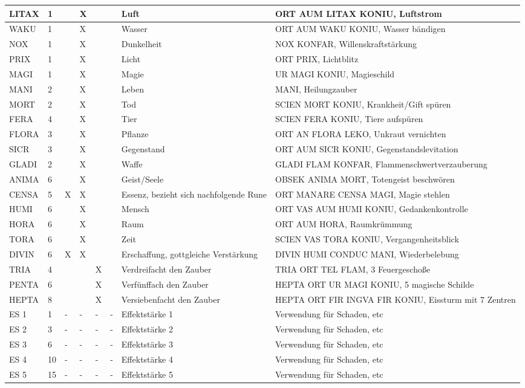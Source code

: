\documentclass{article}
\begin{document}
\begin{footnotesize}
\begin{tabular}{|m{1.7cm}|m{0.3cm}|m{1cm}|m{1cm}|m{1cm}|m{1cm}|m{3cm}|m{5cm}|}
\hline
LITAX&1&&X&&&Luft&ORT AUM LITAX KONIU, Luftstrom\\
\hline
WAKU&1&&X&&&Wasser&ORT AUM WAKU KONIU, Wasser bändigen\\
\hline
NOX&1&&X&&&Dunkelheit&NOX KONFAR, Willenskraftstärkung\\
\hline
PRIX&1&&X&&&Licht&ORT PRIX, Lichtblitz\\
\hline
MAGI&1&&X&&&Magie&UR MAGI KONIU, Magieschild\\
\hline
MANI&2&&X&&&Leben&MANI, Heilungzauber\\
\hline
MORT&2&&X&&&Tod&SCIEN MORT KONIU, Krankheit/Gift spüren\\
\hline
\hline
FERA&4&&X&&&Tier&SCIEN FERA KONIU, Tiere aufspüren\\
\hline
FLORA&3&&X&&&Pflanze&ORT AN FLORA LEKO, Unkraut vernichten\\
\hline
SICR&3&&X&&&Gegenstand&ORT AUM SICR KONIU, Gegenstandslevitation\\
\hline
GLADI&2&&X&&&Waffe&GLADI FLAM KONFAR, Flammenschwertverzauberung\\
\hline
\hline
ANIMA&6&&X&&&Geist/Seele&OBSEK ANIMA MORT, Totengeist beschwören\\
\hline
CENSA&5&X&X&&&Essenz, bezieht sich nachfolgende Rune&ORT MANARE CENSA MAGI, Magie stehlen\\
\hline
HUMI&6&&X&&&Mensch&ORT VAS AUM HUMI KONIU, Gedankenkontrolle\\
\hline
HORA&6&&X&&&Raum&ORT AUM HORA, Raumkrümmung\\
\hline
TORA&6&&X&&&Zeit&SCIEN VAS TORA KONIU, Vergangenheitsblick\\
\hline
DIVIN&6&X&X&&&Erschaffung, gottgleiche Verstärkung&DIVIN HUMI CONDUC MANI, Wiederbelebung\\
\hline
TRIA&4&&&X&&Verdreifacht den Zauber&TRIA ORT TEL FLAM, 3 Feuergeschoße\\
\hline
PENTA&6&&&X&&Verfünffach den Zauber&HEPTA ORT UR MAGI KONIU, 5 magische Schilde\\
\hline
HEPTA&8&&&X&&Versiebenfacht den Zauber&HEPTA ORT FIR INGVA FIR KONIU, Eissturm mit 7 Zentren\\
\hline
\hline
ES 1&1&-&-&-&-&Effektstärke 1&Verwendung für Schaden, etc\\
\hline
ES 2&3&-&-&-&-&Effektstärke 2&Verwendung für Schaden, etc\\
\hline
ES 3&6&-&-&-&-&Effektstärke 3&Verwendung für Schaden, etc\\
\hline
ES 4&10&-&-&-&-&Effektstärke 4&Verwendung für Schaden, etc\\
\hline
ES 5&15&-&-&-&-&Effektstärke 5&Verwendung für Schaden, etc\\
\hline
\end{tabular}
\end{footnotesize}
\end{document}
